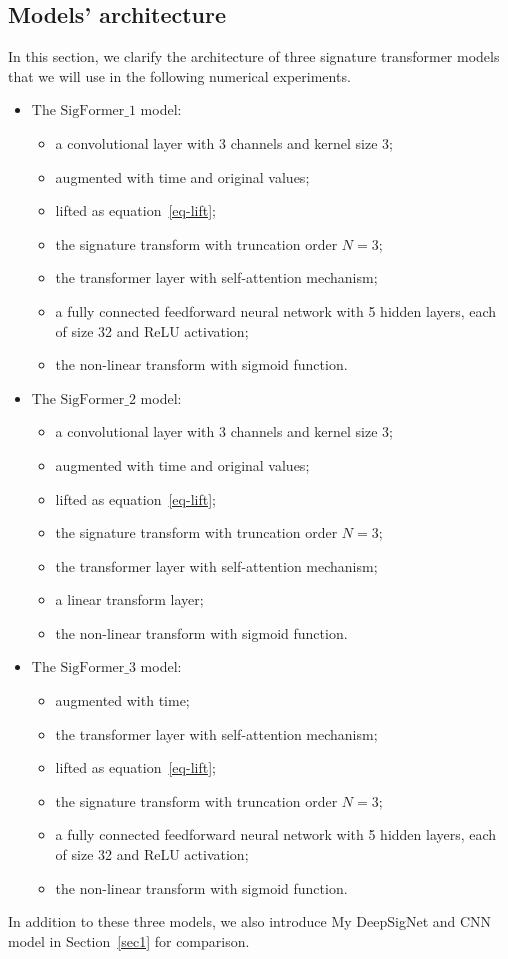 \documentclass[]{article}
\renewcommand{\(}{\left(}
\renewcommand{\)}{\right)}
\begin{document}
	\subsection{Models' architecture}
	In this section, we clarify the architecture of three signature transformer models that we will use in the following numerical experiments.
	\begin{itemize}
		\item The $\text{SigFormer}\_1$ model:
		\begin{itemize}
			\item[-]a convolutional layer with 3 channels and kernel size 3;
			\item[-]augmented with time and original values;
			\item[-]lifted as equation~\eqref{eq-lift};
			\item[-]the signature transform with truncation order $N=3$;
			\item[-]the transformer layer with self-attention mechanism;
			\item[-]a fully connected feedforward neural network with 5 hidden layers, each of size 32 and ReLU activation;
			\item[-]the non-linear transform with sigmoid function.
		\end{itemize}
		\item The $\text{SigFormer}\_2$ model:
		\begin{itemize}
			\item[-]a convolutional layer with 3 channels and kernel size 3;
			\item[-]augmented with time and original values;
			\item[-]lifted as equation~\eqref{eq-lift};
			\item[-]the signature transform with truncation order $N=3$;
			\item[-]the transformer layer with self-attention mechanism;
			\item[-]a linear transform layer;
			\item[-]the non-linear transform with sigmoid function.		
		\end{itemize}
		\item The $\text{SigFormer}\_3$ model:
		\begin{itemize}
			\item[-]augmented with time;
			\item[-]the transformer layer with self-attention mechanism;
			\item[-]lifted as equation~\eqref{eq-lift};
			\item[-]the signature transform with truncation order $N=3$;
			\item[-]a fully connected feedforward neural network with 5 hidden layers, each of size 32 and ReLU activation;
			\item[-]the non-linear transform with sigmoid function.
		\end{itemize}
	\end{itemize}
	In addition to these three models, we also introduce My DeepSigNet and CNN model in Section~\ref{sec1} for comparison.
\end{document}
